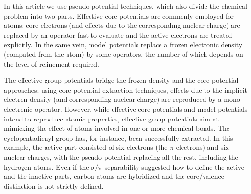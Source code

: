 \documentclass[12pt]{article}
\begin{document}
In this article we use pseudo-potential techniques, which also
divide the chemical problem into two parts.
Effective core potentials are commonly employed for atoms: 
core electrons (and effects due to the corresponding nuclear charge) are
replaced by an operator fast to evaluate and the active electrons are treated
explicitly.\cite{dolg_relativistic_2012}
In the same vein, model potentials replace a frozen electronic density (computed from the atom)
by some operators, the number of which depends on the level of
refinement required.\cite{huzinaga_1994_1995}

The effective group potentials bridge the frozen density and the core potential
approaches: using core potential extraction techniques, effects due to the implicit 
electron density (and corresponding nuclear charge) 
are reproduced by a mono-electronic operator.\cite{carissan_what_2006, raynaud_multicentered_2010}
However, while effective core potentials and model potentials intend to 
reproduce atomic properties,
effective group potentials aim at mimicking the effect of atoms involved in one or more chemical
bonds. The cyclopentadienyl group has, for instance, been successfully extracted.\cite{carissan_what_2006}
In this example, the active part consisted of six electrons (the $\pi$ electrons) and six
nuclear charges, with the pseudo-potential replacing all the rest, including the hydrogen atoms.
Even if the $\sigma / \pi$ separability suggested how to define the active and the inactive parts,
carbon atoms are hybridized and the core/valence distinction is not 
strictly defined.
\end{document}
